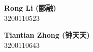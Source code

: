 
\centering

\Large \textbf{Rong Li (郦\hspace{1em}融)}\\
\Large 3200110523

\Large \textbf{Tiantian Zhong (钟天天)}\\
\Large 3200110643

